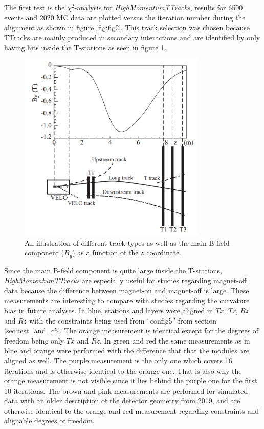 The first test is the $\chi^2$-analysis for \textit{HighMomentumTTracks},
results for 6500 events and 2020 MC data are plotted versus the iteration number during the alignment as shown in figure \ref{fig:fig2}.
This track selection was chosen because TTracks are mainly produced in secondary interactions and are identified by only having hits inside the T-stations as seen in figure \ref{fig:tracksel}.
\begin{figure}[!ht]
    \centering
    \includegraphics[width=0.8\textwidth]{plots/track_selection.png}
    \caption{An illustration of different track types as well as the main B-field component ($B_y$) as a function of the $z$ coordinate.}
    \label{fig:tracksel}
\end{figure}
Since the main B-field component is quite large inside the T-stations, \textit{HighMomentumTTracks} are especially useful for studies regarding magnet-off data because the difference between magnet-on and magnet-off is large.
These measurements are interesting to compare with studies regarding the curvature bias in future analyses.
In blue, stations and layers were aligned in $Tx$,
$Tz$, $Rx$ and $Rz$ with the constraints being used from ``config5'' from section \ref{sec:test_and_c5}. The orange
measurement is identical except for the degrees of freedom being only $Tx$ and $Rz$.
In green and red the same measurements as in blue and orange were performed with
the difference that that the modules are aligned as well.
The purple measurement is the only one which covers 16 iterations and is otherwise identical to the orange one. That is also why the orange measurement is not visible since it lies behind the purple one for the first 10 iterations.
The brown and pink measurements are performed for simulated data with an older description of the detector geometry from 2019, and are otherwise identical to the orange and red measurement regarding constraints and alignable degrees of freedom.


